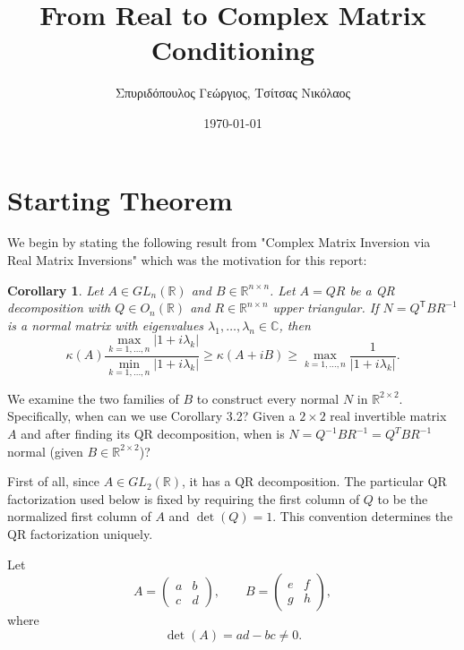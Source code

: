 \documentclass[11pt, reqno, a4paper]{amsart}
\theoremstyle{plain}
\newtheorem{corollary}[theorem]{Corollary}
\theoremstyle{definition}
\theoremstyle{remark}
\numberwithin{equation}{section}
\begin{document}

\title{From Real to Complex Matrix Conditioning}

\author{Σπυριδόπουλος Γεώργιος, Τσίτσας Νικόλαος}


\date{\today}

\maketitle


\section{Starting Theorem}

We begin by stating the following result from "Complex Matrix Inversion via Real Matrix Inversions"\cite{dai2023complex} which was the motivation for this report:

\begin{corollary}
Let $A \in GL_n(\mathbb{R})$ and $B \in \mathbb{R}^{n \times n}$. Let $A = QR$ be a QR decomposition with $Q \in O_n(\mathbb{R})$ and $R \in \mathbb{R}^{n \times n}$ upper triangular. If $N = Q^\mathsf{T} B R^{-1}$ is a normal matrix with eigenvalues $\lambda_1, \dots, \lambda_n \in \mathbb{C}$, then
\[
\kappa(A) \frac{\max_{k=1,\dots,n} |1 + i\lambda_k|}{\min_{k=1,\dots,n} |1 + i\lambda_k|} \ge \kappa(A + iB) \ge \max_{k=1,\dots,n} \frac{1}{|1 + i\lambda_k|}.
\]
\end{corollary}

We examine the two families of $B$ to construct every normal $N$ in $\mathbb{R}^{2\times2}$. Specifically, when can we use Corollary 3.2? Given a $2\times2$ real invertible matrix $A$ and after finding its QR decomposition, when is $N=Q^{-1}BR^{-1}=Q^TBR^{-1}$ normal (given $B\in\mathbb{R}^{2\times2}$)?

First of all, since $A\in GL_2(\mathbb{R})$, it has a QR decomposition. The particular QR factorization used below is fixed by requiring the first column of $Q$ to be the normalized first column of $A$ and $\det(Q)=1$. This convention determines the QR factorization uniquely.

Let
\[
A=
\begin{pmatrix}
a&b\\
c&d
\end{pmatrix},
\qquad
B=
\begin{pmatrix}
e&f\\
g&h
\end{pmatrix},
\]
where
\[
\det(A)=ad-bc\neq0.
\]
\end{document}
